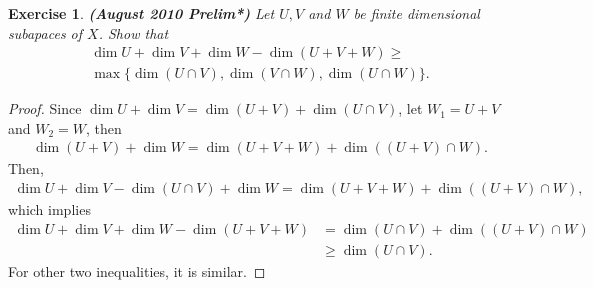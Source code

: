 \documentclass[11pt]{book}
\newtheorem{exercise}{Exercise}[section]
\theoremstyle{definition}
\numberwithin{equation}{chapter}
\begin{document}
\medskip

\begin{exercise}{\bf (August 2010 Prelim*)}
Let $U, V$ and $W$ be finite dimensional subapaces of $X$. Show that
\begin{align*}
    \dim U + \dim V + \dim W - \dim (U + V + W) \geq \\
    \max \{\dim(U \cap V), \dim(V \cap W), \dim(U \cap W)\}.
\end{align*}
\end{exercise}
\begin{proof}
Since $\dim U + \dim V = \dim (U + V) + \dim (U \cap V)$, let $W_1 = U + V$ and $W_2 = W$, then 
\begin{align*}
    \dim (U+V) + \dim W = \dim (U + V + W) + \dim ((U+V) \cap W).
\end{align*}
Then,
\begin{align*}
    \dim U + \dim V - \dim (U \cap V) + \dim W = \dim (U + V + W) + \dim ((U+V) \cap W),
\end{align*}
which implies
\begin{align*}
    \dim U + \dim V + \dim W - \dim (U + V + W) & = \dim (U \cap V) + \dim ((U+V) \cap W) \\
    & \geq \dim (U \cap V).
\end{align*}
For other two inequalities, it is similar.
\end{proof}

\medskip
\end{document}
